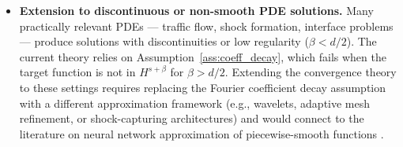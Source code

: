 \documentclass[12pt,a4paper]{article}
\begin{document}
\begin{itemize}
    \item \textbf{Extension to discontinuous or non-smooth PDE solutions.}
        Many practically relevant PDEs — traffic flow, shock formation, interface
        problems — produce solutions with discontinuities or low regularity
        ($\beta < d/2$).  The current theory relies on Assumption~\ref{ass:coeff_decay},
        which fails when the target function is not in $H^{s+\beta}$ for $\beta > d/2$.
        Extending the convergence theory to these settings requires replacing the
        Fourier coefficient decay assumption with a different approximation
        framework (e.g., wavelets, adaptive mesh refinement, or shock-capturing
        architectures) and would connect to the literature on neural network
        approximation of piecewise-smooth functions \citep{petersen2018optimal,
        kutyniok2022nn}.
\end{itemize}
\end{document}
